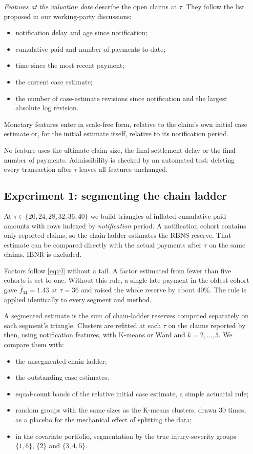 \emph{Features at the valuation date} describe the open claims at $\tau$. They follow the list proposed in our working-party discussions:
\begin{itemize}[leftmargin=*]
\item notification delay and age since notification;
\item cumulative paid and number of payments to date;
\item time since the most recent payment;
\item the current case estimate;
\item the number of case-estimate revisions since notification and the largest absolute log revision.
\end{itemize}
Monetary features enter in scale-free form, relative to the claim's own initial case estimate or, for the initial estimate itself, relative to its notification period.

No feature uses the ultimate claim size, the final settlement delay or the final number of payments. Admissibility is checked by an automated test: deleting every transaction after $\tau$ leaves all features unchanged.

\subsection{Experiment 1: segmenting the chain ladder}
\label{sec:meth-cl}

At $\tau \in \{20, 24, 28, 32, 36, 40\}$ we build triangles of inflated cumulative paid amounts with rows indexed by \emph{notification} period. A notification cohort contains only reported claims, so the chain ladder estimates the RBNS reserve. That estimate can be compared directly with the actual payments after $\tau$ on the same claims. IBNR is excluded.

Factors follow \eqref{eq:cl} without a tail. A factor estimated from fewer than five cohorts is set to one. Without this rule, a single late payment in the oldest cohort gave $\hat f_{34} = 1.43$ at $\tau = 36$ and raised the whole reserve by about 40\%. The rule is applied identically to every segment and method.

A segmented estimate is the sum of chain-ladder reserves computed separately on each segment's triangle. Clusters are refitted at each $\tau$ on the claims reported by then, using notification features, with K-means or Ward and $k = 2,\dots,5$. We compare them with:
\begin{itemize}[leftmargin=*]
\item the unsegmented chain ladder;
\item the outstanding case estimates;
\item equal-count bands of the relative initial case estimate, a simple actuarial rule;
\item random groups with the same sizes as the K-means clusters, drawn 30 times, as a placebo for the mechanical effect of splitting the data;
\item in the covariate portfolio, segmentation by the true injury-severity groups $\{1,6\}$, $\{2\}$ and $\{3,4,5\}$.
\end{itemize}


